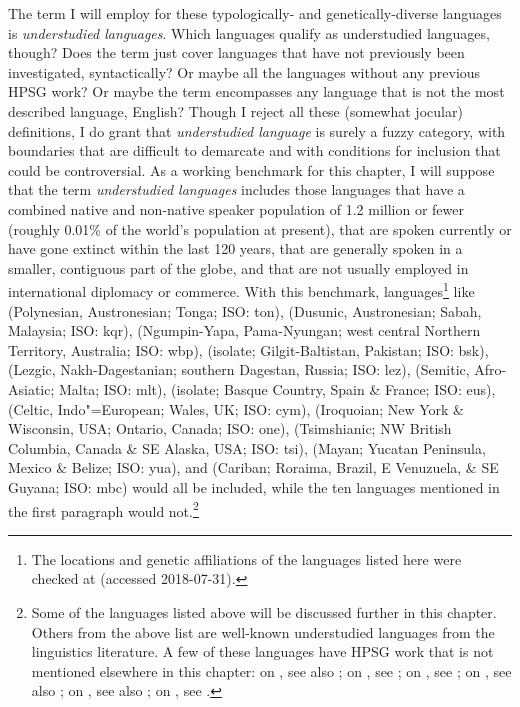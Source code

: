 \documentclass[output=paper
	        ,collection
	        ,collectionchapter
 	        ,biblatex
                ,babelshorthands
                ,newtxmath
                ,draftmode
                ,colorlinks, citecolor=brown
]{langscibook}
\begin{document}
The term I will employ for these typologically- and genetically-diverse languages is \emph{understudied languages}. Which languages qualify as understudied languages, though? Does the term just cover languages that have not previously been investigated, syntactically? Or maybe all the languages without any previous HPSG work? Or maybe the term encompasses any language that is not the most described language, English? Though I reject all these (somewhat jocular) definitions, I do grant that \textit{understudied language} is surely a fuzzy category, with boundaries that are difficult to demarcate and with conditions for inclusion that could be controversial. As a working benchmark for this chapter, I will suppose that the term \textit{understudied languages} includes those languages that have a combined native and non-native speaker population of 1.2 million or fewer (roughly 0.01\% of the world's population at present), that are spoken currently or have gone extinct within the last 120 years, that are generally spoken in a smaller, contiguous part of the globe, and that are not usually employed in international diplomacy or commerce. With this benchmark, languages\footnote{The locations and genetic affiliations of the languages listed here were checked at \citet{glottolog18} (accessed 2018-07-31).} like
 (Polynesian, Austronesian; Tonga; ISO: ton), 
 (Dusunic, Austronesian; Sabah, Malaysia; ISO: kqr),
 (Ngumpin-Yapa, Pama-Nyungan; west central Northern Territory, Australia; ISO: wbp), 
 (isolate; Gilgit-Baltistan, Pakistan; ISO: bsk), 
 (Lezgic, Nakh-Dagestanian; southern Dagestan, Russia; ISO: lez), 
 (Semitic, Afro-Asiatic; Malta; ISO: mlt), 
 (isolate; Basque Country, Spain \& France; ISO: eus),  
 (Celtic, Indo"=European; Wales, UK; ISO: cym), 
 (Iroquoian; New York \& Wisconsin, USA; Ontario, Canada; ISO: one), 
 (Tsimshianic; NW British Columbia, Canada \& SE Alaska, USA; ISO: tsi),
 (Mayan; Yucatan Peninsula, Mexico \& Belize; ISO: yua), and
 (Cariban; Roraima, Brazil, E Venuzuela, \& SE Guyana; ISO: mbc)
would all be included, while the ten languages mentioned in the first paragraph would not.\footnote{\label{list expln}Some of the languages listed above will be discussed further in this chapter. Others from the above list are well-known understudied languages from the linguistics literature. A few of these languages have HPSG work that is not mentioned elsewhere in this chapter: on , see also \citet{dukes2000}; on , see \citet{donosag99}; on , see \citet{MuellerMalteseSketch}; on , see also \citet{CB11}; on , see also \citet{KM2010a-u}; on , see \citet{dabkowski17}.}   
\end{document}
